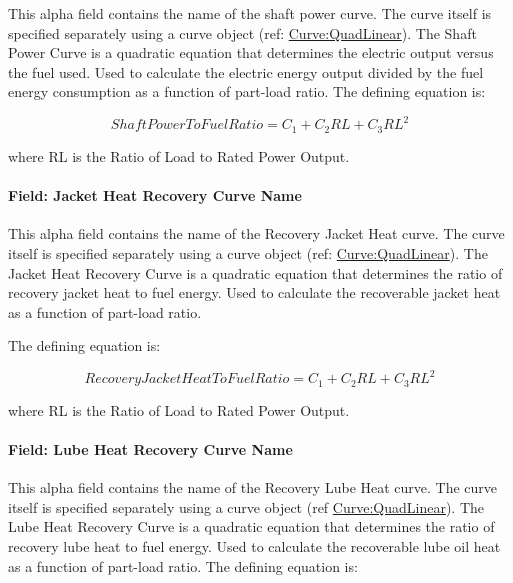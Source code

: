 This alpha field contains the name of the shaft power curve. The curve itself is specified separately using a curve object (ref: \hyperref[curvequadlinear]{Curve:QuadLinear}). The Shaft Power Curve is a quadratic equation that determines the electric output versus the fuel used. Used to calculate the electric energy output divided by the fuel energy consumption as a function of part-load ratio. The defining equation is:

\begin{equation}
ShaftPowerToFuelRatio = {C_1} + {C_2}RL + {C_3}R{L^2}
\end{equation}

where RL is the Ratio of Load to Rated Power Output.

\paragraph{Field: Jacket Heat Recovery Curve Name}\label{field-jacket-heat-recovery-curve-name}

This alpha field contains the name of the Recovery Jacket Heat curve. The curve itself is specified separately using a curve object (ref: \hyperref[curvequadlinear]{Curve:QuadLinear}). The Jacket Heat Recovery Curve is a quadratic equation that determines the ratio of recovery jacket heat to fuel energy. Used to calculate the recoverable jacket heat as a function of part-load ratio.

The defining equation is:

\begin{equation}
RecoveryJacketHeatToFuelRatio = {C_1} + {C_2}RL + {C_3}R{L^2}
\end{equation}

where RL is the Ratio of Load to Rated Power Output.

\paragraph{Field: Lube Heat Recovery Curve Name}\label{field-lube-heat-recovery-curve-name}

This alpha field contains the name of the Recovery Lube Heat curve. The curve itself is specified separately using a curve object (ref \hyperref[curvequadlinear]{Curve:QuadLinear}). The Lube Heat Recovery Curve is a quadratic equation that determines the ratio of recovery lube heat to fuel energy. Used to calculate the recoverable lube oil heat as a function of part-load ratio. The defining equation is:

